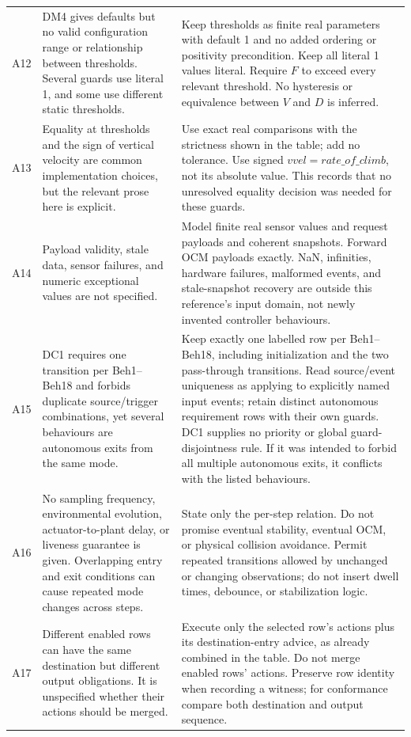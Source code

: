 \documentclass[10pt,a4paper]{article}
\begin{document}
\begin{longtable}{@{}L{0.07\textwidth}L{0.40\textwidth}L{0.45\textwidth}@{}}
A12 & DM4 gives defaults but no valid configuration range or relationship between thresholds. Several guards use literal 1, and some use different static thresholds. & Keep thresholds as finite real parameters with default 1 and no added ordering or positivity precondition. Keep all literal 1 values literal. Require $\mathit{F}$ to exceed every relevant threshold. No hysteresis or equivalence between $\mathit{V}$ and $\mathit{D}$ is inferred. \\
A13 & Equality at thresholds and the sign of vertical velocity are common implementation choices, but the relevant prose here is explicit. & Use exact real comparisons with the strictness shown in the table; add no tolerance. Use signed $\mathit{vvel} = \mathit{rate\_of\_climb}$, not its absolute value. This records that no unresolved equality decision was needed for these guards. \\
A14 & Payload validity, stale data, sensor failures, and numeric exceptional values are not specified. & Model finite real sensor values and request payloads and coherent snapshots. Forward OCM payloads exactly. NaN, infinities, hardware failures, malformed events, and stale-snapshot recovery are outside this reference's input domain, not newly invented controller behaviours. \\
A15 & DC1 requires one transition per Beh1--Beh18 and forbids duplicate source/trigger combinations, yet several behaviours are autonomous exits from the same mode. & Keep exactly one labelled row per Beh1--Beh18, including initialization and the two pass-through transitions. Read source/event uniqueness as applying to explicitly named input events; retain distinct autonomous requirement rows with their own guards. DC1 supplies no priority or global guard-disjointness rule. If it was intended to forbid all multiple autonomous exits, it conflicts with the listed behaviours. \\
A16 & No sampling frequency, environmental evolution, actuator-to-plant delay, or liveness guarantee is given. Overlapping entry and exit conditions can cause repeated mode changes across steps. & State only the per-step relation. Do not promise eventual stability, eventual OCM, or physical collision avoidance. Permit repeated transitions allowed by unchanged or changing observations; do not insert dwell times, debounce, or stabilization logic. \\
A17 & Different enabled rows can have the same destination but different output obligations. It is unspecified whether their actions should be merged. & Execute only the selected row's actions plus its destination-entry advice, as already combined in the table. Do not merge enabled rows' actions. Preserve row identity when recording a witness; for conformance compare both destination and output sequence. \\
\bottomrule
\end{longtable}
\end{document}
